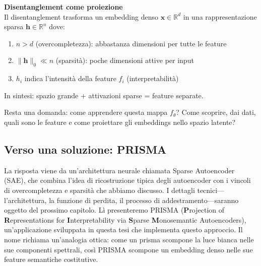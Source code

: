 \begin{notebox}
\textbf{Disentanglement come proiezione}\\
Il disentanglement trasforma un embedding denso $\mathbf{x} \in \mathbb{R}^d$ in una rappresentazione sparsa $\mathbf{h} \in \mathbb{R}^n$ dove:
\begin{enumerate}
    \item $n > d$ (overcompletezza): abbastanza dimensioni per tutte le feature
    \item $\|\mathbf{h}\|_0 \ll n$ (sparsità): poche dimensioni attive per input
    \item $h_i$ indica l'intensità della feature $f_i$ (interpretabilità)
\end{enumerate}
In sintesi: spazio grande + attivazioni sparse = feature separate.
\end{notebox}

Resta una domanda: come apprendere questa mappa $f_\theta$? Come scoprire, dai dati, quali sono le feature e come proiettare gli embeddings nello spazio latente?
\subsection{Verso una soluzione: PRISMA}
\label{subsec:verso_soluzione}
La risposta viene da un'architettura neurale chiamata Sparse Autoencoder (SAE), che combina l'idea di ricostruzione tipica degli autoencoder con i vincoli di overcompletezza e sparsità che abbiamo discusso. I dettagli tecnici—l'architettura, la funzione di perdita, il processo di addestramento—saranno oggetto del prossimo capitolo.
Lì presenteremo PRISMA (\textbf{P}rojection of \textbf{R}epresentations for \textbf{I}nterpretability via \textbf{S}parse \textbf{M}onosemantic Autoencoders), un'applicazione sviluppata in questa tesi che implementa questo approccio. Il nome richiama un'analogia ottica: come un prisma scompone la luce bianca nelle sue componenti spettrali, così PRISMA scompone un embedding denso nelle sue feature semantiche costitutive.
